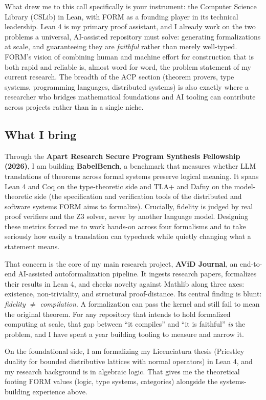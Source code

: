 \documentclass[11pt,a4paper]{article}
\begin{document}
What drew me to this call specifically is your instrument: the Computer Science Library (CSLib) in Lean, with FORM as a founding player in its technical leadership. Lean 4 is my primary proof assistant, and I already work on the two problems a universal, AI-assisted repository must solve: generating formalizations at scale, and guaranteeing they are \emph{faithful} rather than merely well-typed. FORM's vision of combining human and machine effort for construction that is both rapid and reliable is, almost word for word, the problem statement of my current research. The breadth of the ACP section (theorem provers, type systems, programming languages, distributed systems) is also exactly where a researcher who bridges mathematical foundations and AI tooling can contribute across projects rather than in a single niche.

\subsection*{What I bring}

Through the \textbf{Apart Research Secure Program Synthesis Fellowship (2026)}, I am building \textbf{BabelBench}, a benchmark that measures whether LLM translations of theorems across formal systems preserve logical meaning. It spans Lean 4 and Coq on the type-theoretic side and TLA+ and Dafny on the model-theoretic side (the specification and verification tools of the distributed and software systems FORM aims to formalize). Crucially, fidelity is judged by real proof verifiers and the Z3 solver, never by another language model. Designing these metrics forced me to work hands-on across four formalisms and to take seriously how easily a translation can typecheck while quietly changing what a statement means.

That concern is the core of my main research project, \textbf{AViD Journal}, an end-to-end AI-assisted autoformalization pipeline. It ingests research papers, formalizes their results in Lean 4, and checks novelty against Mathlib along three axes: existence, non-triviality, and structural proof-distance. Its central finding is blunt: \textit{fidelity \(\neq\) compilation}. A formalization can pass the kernel and still fail to mean the original theorem. For any repository that intends to hold formalized computing at scale, that gap between ``it compiles'' and ``it is faithful'' \emph{is} the problem, and I have spent a year building tooling to measure and narrow it.

On the foundational side, I am formalizing my Licenciatura thesis (Priestley duality for bounded distributive lattices with normal operators) in Lean 4, and my research background is in algebraic logic. That gives me the theoretical footing FORM values (logic, type systems, categories) alongside the systems-building experience above.
\end{document}
